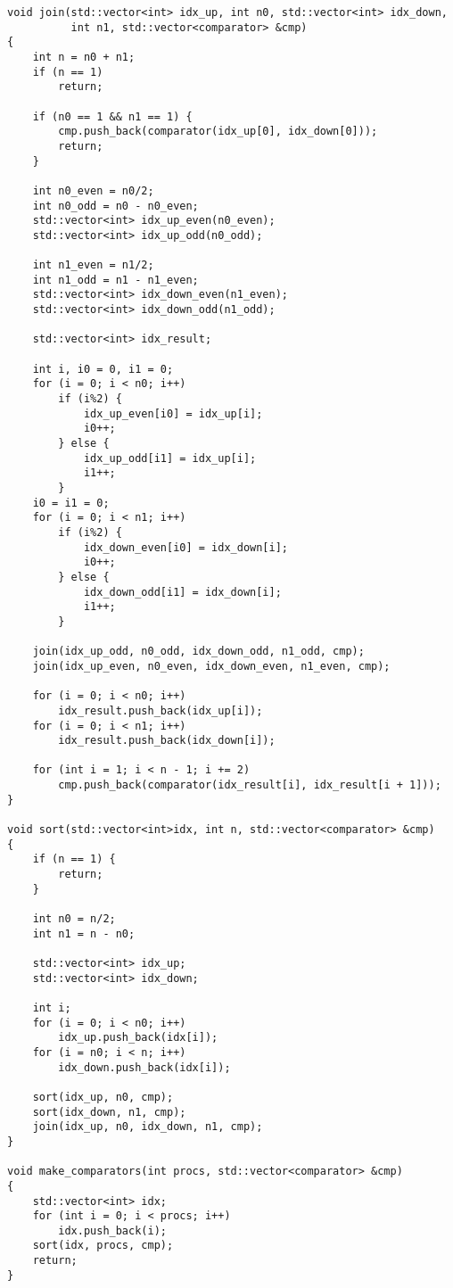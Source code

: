 \documentclass[oneside,final,14pt]{extreport}
\begin{document}
\begin{verbatim}
void join(std::vector<int> idx_up, int n0, std::vector<int> idx_down,
          int n1, std::vector<comparator> &cmp)
{
    int n = n0 + n1;
    if (n == 1)
        return;

    if (n0 == 1 && n1 == 1) {
        cmp.push_back(comparator(idx_up[0], idx_down[0]));
        return;
    }

    int n0_even = n0/2;
    int n0_odd = n0 - n0_even;
    std::vector<int> idx_up_even(n0_even);
    std::vector<int> idx_up_odd(n0_odd);

    int n1_even = n1/2;
    int n1_odd = n1 - n1_even;
    std::vector<int> idx_down_even(n1_even);
    std::vector<int> idx_down_odd(n1_odd);

    std::vector<int> idx_result;

    int i, i0 = 0, i1 = 0;
    for (i = 0; i < n0; i++)
        if (i%2) {
            idx_up_even[i0] = idx_up[i];
            i0++;
        } else {
            idx_up_odd[i1] = idx_up[i];
            i1++;
        }
    i0 = i1 = 0;
    for (i = 0; i < n1; i++)
        if (i%2) {
            idx_down_even[i0] = idx_down[i];
            i0++;
        } else {
            idx_down_odd[i1] = idx_down[i];
            i1++;
        }

    join(idx_up_odd, n0_odd, idx_down_odd, n1_odd, cmp);
    join(idx_up_even, n0_even, idx_down_even, n1_even, cmp);

    for (i = 0; i < n0; i++)
        idx_result.push_back(idx_up[i]);
    for (i = 0; i < n1; i++)
        idx_result.push_back(idx_down[i]);

    for (int i = 1; i < n - 1; i += 2)
        cmp.push_back(comparator(idx_result[i], idx_result[i + 1]));
}

void sort(std::vector<int>idx, int n, std::vector<comparator> &cmp)
{
    if (n == 1) {
        return;
    }

    int n0 = n/2;
    int n1 = n - n0;

    std::vector<int> idx_up;
    std::vector<int> idx_down;

    int i;
    for (i = 0; i < n0; i++)
        idx_up.push_back(idx[i]);
    for (i = n0; i < n; i++)
        idx_down.push_back(idx[i]);

    sort(idx_up, n0, cmp);
    sort(idx_down, n1, cmp);
    join(idx_up, n0, idx_down, n1, cmp);
}

void make_comparators(int procs, std::vector<comparator> &cmp)
{
    std::vector<int> idx;
    for (int i = 0; i < procs; i++)
        idx.push_back(i);
    sort(idx, procs, cmp);
    return;
}


\end{verbatim}
\end{document}
